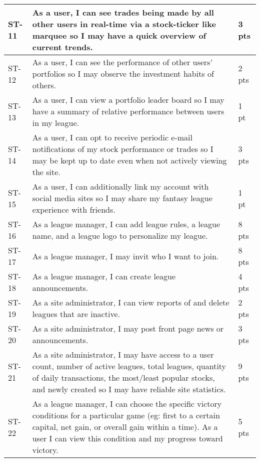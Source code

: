 \begin{longtable}{|p{0.6in}|p{4.6in}|p{0.5in}|}
ST-11&As a user, I can see trades being made by all other users in real-time via
a stock-ticker like marquee so I may have a quick overview of current trends.&3
pts  \\ \hline

ST-12&As a user, I can see the performance of other users' portfolios so I may
observe the investment habits of others.&2 pts  \\ \hline

ST-13&As a user, I can view a portfolio leader board so I may have a summary of
relative performance between users in my league.&1 pt   \\ \hline

ST-14&As a user, I can opt to receive periodic e-mail notifications of my stock
performance or trades so I may be kept up to date even when not actively viewing
the site.&3 pts  \\ \hline

ST-15&As a user, I can additionally link my account with social media sites so
I may share my fantasy league experience with friends.&1 pt   \\ \hline

ST-16&As a league manager, I can add league rules, a league name, and a league
logo to personalize my league.&8 pts  \\ \hline

ST-17&As a league manager, I may invit who I want to join.&8 pts
\\ \hline

ST-18&As a league manager, I can create league announcements.&4 pts  \\ \hline

ST-19&As a site administrator, I can view reports of and delete leagues that are
inactive.&2 pts  \\ \hline

ST-20&As a site administrator, I may post front page news or announcements.&3
pts  \\ \hline

ST-21&As a site administrator, I may have access to a user count, number of
active leagues, total leagues, quantity of daily transactions, the most/least
popular stocks, and newly created so I may have reliable site statistics. &9 pts
\\ \hline

ST-22&As a league manager, I can choose the specific victory conditions for a particular
game (eg: first to a certain capital, net gain, or overall gain within a time).
As a user I can view this condition and my progress toward victory.&5 pts \\ \hline

\end{longtable}

